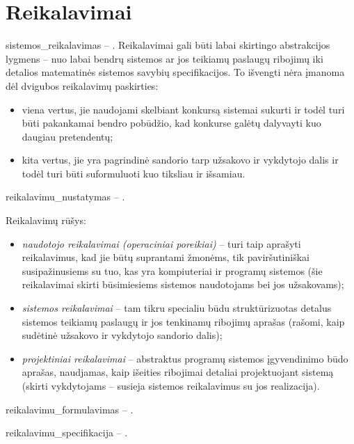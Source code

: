 \section{Reikalavimai}


\Gls{sistemos_reikalavimas} – .
Reikalavimai gali būti labai skirtingo abstrakcijos lygmens – nuo 
labai bendrų sistemos ar jos teikiamų paslaugų ribojimų iki detalios
matematinės sistemos savybių specifikacijos. To išvengti nėra įmanoma
dėl dvigubos reikalavimų paskirties:
\begin{itemize}
  \item viena vertus, jie naudojami skelbiant konkursą sistemai sukurti
    ir todėl turi būti pakankamai bendro pobūdžio, kad konkurse galėtų
    dalyvayti kuo daugiau pretendentų;
  \item kita vertus, jie yra pagrindinė sandorio tarp užsakovo ir vykdytojo
    dalis ir todėl turi būti suformuluoti kuo tiksliau ir išsamiau.
\end{itemize}

\Gls{reikalavimu_nustatymas} – .

Reikalavimų rūšys:
\begin{itemize}
  \item \emph{naudotojo reikalavimai (operaciniai poreikiai)} – turi 
    taip aprašyti reikalavimus, kad jie būtų suprantami žmonėms, tik
    paviršutiniškai susipažinusiems su tuo, kas yra kompiuteriai ir
    programų sistemos (šie reikalavimai skirti būsimiesiems sistemos
    naudotojams bei jos užsakovams);
  \item \emph{sistemos reikalavimai} – tam tikru specialiu būdu 
    struktūrizuotas detalus sistemos teikiamų paslaugų ir jos tenkinamų
    ribojimų aprašas (rašomi, kaip sudėtinė užsakovo ir vykdytojo
    sandorio dalis);
  \item \emph{projektiniai reikalavimai} – abstraktus programų sistemos
    įgyvendinimo būdo aprašas, naudjamas, kaip išeities ribojimai detaliai
    projektuojant sistemą (skirti vykdytojams – susieja sistemos 
    reikalavimus su jos realizacija).
\end{itemize}

\Gls{reikalavimu_formulavimas} – .

\Gls{reikalavimu_specifikacija} – .

